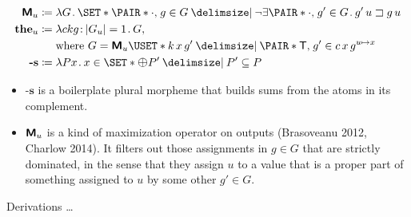 \documentclass[10pt,fleqn]{article}
\newcommand{\M}{\text{\sffamily\bfseries M}}
\begin{document}
\begin{minipage}[t]{0.5\textwidth} %
\begin{spreadlines}{0pt}
\begin{align*}
  \M_u &\coloneq
  \l G \dt
    \set{%
      \pair{\cdot}{g} \in G
    \giv
      \neg\exists\pair{\cdot}{g'} \in G \dt g'\,u \sqsupset g\,u
    } \\
  \textbf{the}_u &\coloneq
    \l ckg \col |G_u| = 1 \dt G, \\
  &\hphantom{{}\coloneq{}}
    \text{where}\ 
    G = \M_u\uset{k\,x\,g' \giv \pair{\cn{T}}{g'} \in c\,x\,g^{u\mapsto x}} \\
  \textbf{-s} &\coloneq
  \l Px \dt x \in \set{\mathlarger{\oplus} P' \giv P' \subseteq P}
\end{align*}  
\end{spreadlines}
\end{minipage}
%
%
\begin{minipage}[t]{0.5\textwidth} %
\begin{spreadlines}{0pt}
  \begin{itemize}
    \item
      $\textbf{-s}$ is a boilerplate plural morpheme that builds sums from the
      atoms in its complement.
    \item
      $\M_u$ is a kind of maximization operator on outputs (Brasoveanu
      2012, Charlow 2014). It filters out those assignments in $g \in G$ that
      are strictly dominated, in the sense that they assign $u$ to a value
      that is a proper part of something assigned to $u$ by some other $g' \in
      G$.
  \end{itemize}
\end{spreadlines}
\end{minipage}

\dotfill

Derivations \dots


\newpage

\dotfill
\end{document}
